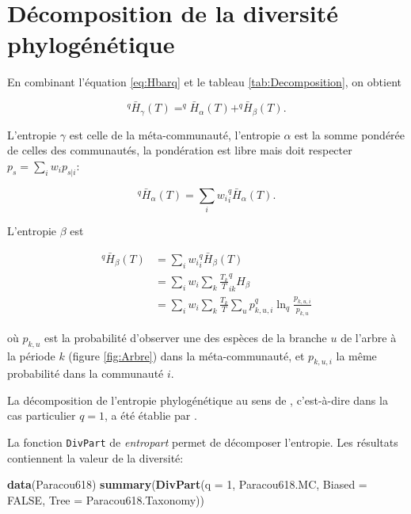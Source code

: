 \documentclass[
  11pt,
  french,
  a4paper,
  extrafontsizes,onecolumn,openright
  ]{memoir}
\newenvironment{Shaded}{\begin{snugshade}}{\end{snugshade}}
\newcommand{\AttributeTok}[1]{\textcolor[rgb]{0.13,0.29,0.53}{#1}}
\newcommand{\ConstantTok}[1]{\textcolor[rgb]{0.56,0.35,0.01}{#1}}
\newcommand{\DecValTok}[1]{\textcolor[rgb]{0.00,0.00,0.81}{#1}}
\newcommand{\FunctionTok}[1]{\textcolor[rgb]{0.13,0.29,0.53}{\textbf{#1}}}
\newcommand{\NormalTok}[1]{#1}
\begin{document}
\section{Décomposition de la diversité phylogénétique}\label{duxe9composition-de-la-diversituxe9-phyloguxe9nuxe9tique}

En combinant l'équation \eqref{eq:Hbarq} et le tableau \ref{tab:Decomposition}, on obtient

\begin{equation}
  \label{eq:Hqbar}
  ^{q}\!\bar{H}_{\gamma}\left(T\right)
  = ^{q}\!\bar{H}_{\alpha}\left(T\right)
  + ^{q}\!\bar{H}_{\beta}\left(T\right).
\end{equation}

L'entropie \(\gamma\) est celle de la méta-communauté, l'entropie \(\alpha\) est la somme pondérée de celles des communautés, la pondération est libre mais doit respecter \(p_s=\sum_i{w_ip_{s|i}}\):

\begin{equation}
  \label{eq:Hqbaralpha}
  ^{q}\!\bar{H}_{\alpha}\left(T\right)
  = \sum_i{w_i{^{q}_{i}\!\bar{H}_{\alpha}}\left(T\right)}.
\end{equation}

L'entropie \(\beta\) est

\begin{align}
  \label{eq:Hqbarbeta}
  ^{q}\!\bar{H}_{\beta}\left(T\right)
  &= \sum_i{w_i}^{q}_{i}\!\bar{H}_{\beta}\left(T\right)\\
  &= \sum_i{w_i}\sum_k{\frac{T_k}{T}^{q}_{ik}\!H_{\beta}}\\
  &= \sum_i{w_i}\sum_k{\frac{T_k}{T}\sum_u{p^{q}_{k,u,i}\ln_q\frac{p_{k,u,i}}{p_{k,u}}}}
\end{align}

où \(p_{k,u}\) est la probabilité d'observer une des espèces de la branche \(u\) de l'arbre à la période \(k\) (figure \ref{fig:Arbre}) dans la méta-communauté, et \(p_{k,u,i}\) la même probabilité dans la communauté \(i\).

La décomposition de l'entropie phylogénétique au sens de \textcite{Allen2009}, c'est-à-dire dans la cas particulier \(q=1\), a été établie par \textcite{Mouchet2011}.

La fonction \texttt{DivPart} de \emph{entropart} permet de décomposer l'entropie.
Les résultats contiennent la valeur de la diversité:

\scriptsize

\begin{Shaded}
\begin{Highlighting}[]
\FunctionTok{data}\NormalTok{(Paracou618)}
\FunctionTok{summary}\NormalTok{(}\FunctionTok{DivPart}\NormalTok{(}\AttributeTok{q =} \DecValTok{1}\NormalTok{, Paracou618.MC, }\AttributeTok{Biased =} \ConstantTok{FALSE}\NormalTok{,}
                \AttributeTok{Tree =}\NormalTok{ Paracou618.Taxonomy))}
\end{Highlighting}
\end{Shaded}
\end{document}
